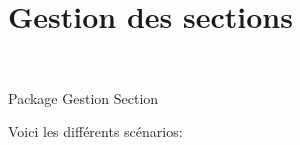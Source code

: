 \section{Gestion des sections}

\begin{center}
\\
\par{Package Gestion Section}
\end{center}
Voici les diff{\'e}rents sc{\'e}narios:\\
